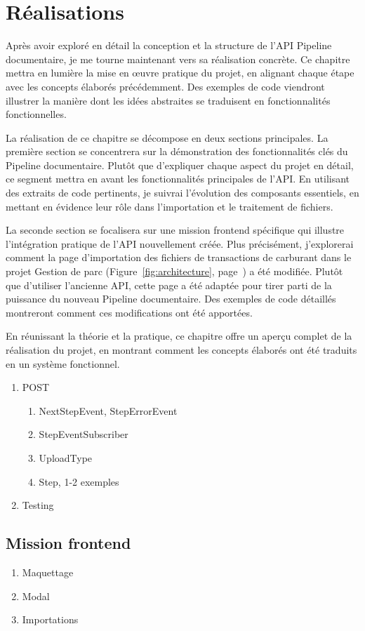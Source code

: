 \chapter{Réalisations}\label{ch:realisations}

Après avoir exploré en détail la conception et la structure de l'API Pipeline documentaire, je me tourne maintenant vers sa réalisation concrète. Ce chapitre mettra en lumière la mise en œuvre pratique du projet, en alignant chaque étape avec les concepts élaborés précédemment. Des exemples de code viendront illustrer la manière dont les idées abstraites se traduisent en fonctionnalités fonctionnelles.

La réalisation de ce chapitre se décompose en deux sections principales. La première section se concentrera sur la démonstration des fonctionnalités clés du Pipeline documentaire. Plutôt que d'expliquer chaque aspect du projet en détail, ce segment mettra en avant les fonctionnalités principales de l'API. En utilisant des extraits de code pertinents, je suivrai l'évolution des composants essentiels, en mettant en évidence leur rôle dans l'importation et le traitement de fichiers.

La seconde section se focalisera sur une mission frontend spécifique qui illustre l'intégration pratique de l'API nouvellement créée. Plus précisément, j'explorerai comment la page d'importation des fichiers de transactions de carburant dans le projet Gestion de parc (Figure~\ref{fig:architecture}, page~\pageref{fig:architecture}) a été modifiée. Plutôt que d'utiliser l'ancienne API, cette page a été adaptée pour tirer parti de la puissance du nouveau Pipeline documentaire. Des exemples de code détaillés montreront comment ces modifications ont été apportées.

En réunissant la théorie et la pratique, ce chapitre offre un aperçu complet de la réalisation du projet, en montrant comment les concepts élaborés ont été traduits en un système fonctionnel.



\begin{enumerate}
    \item POST
          \begin{enumerate}
              \item NextStepEvent, StepErrorEvent
              \item StepEventSubscriber
              \item UploadType
              \item Step, 1-2 exemples
          \end{enumerate}
    \item Testing
\end{enumerate}

\section{Mission frontend}

\begin{enumerate}
    \item Maquettage
    \item Modal
    \item Importations
\end{enumerate}